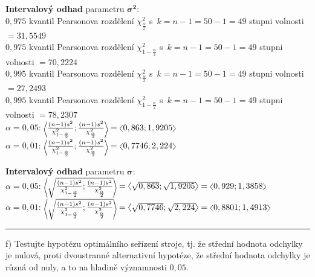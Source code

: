 \documentclass[a4paper, 11pt]{article}
\newcommand{\intlr}[1]{\scaleleftright[1ex]{<}{#1}{>}}
\begin{document}
	\vspace{1em}
	\textbf{Intervalový odhad} parametru $ \boldsymbol{\sigma^2} $: \\
	$ 0,975 $ kvantil Pearsonova rozdělení $ \chi_{\frac{\alpha}{2}}^2 $
	s~$ k = n - 1 = 50 - 1 = 49 $ stupni volnosti $ = 31,5549 $ \\
	$ 0,975 $ kvantil Pearsonova rozdělení $ \chi_{1 - \frac{\alpha}{2}}^2 $
	s~$ k = n - 1 = 50 - 1 = 49 $ stupni volnosti $ = 70,2224 $ \\
	$ 0,995 $ kvantil Pearsonova rozdělení $ \chi_{\frac{\alpha}{2}}^2 $
	s~$ k = n - 1 = 50 - 1 = 49 $ stupni volnosti $ = 27,2493 $ \\
	$ 0,995 $ kvantil Pearsonova rozdělení $ \chi_{1 - \frac{\alpha}{2}}^2 $
	s~$ k = n - 1 = 50 - 1 = 49 $ stupni volnosti $ = 78,2307 $ \\
	$ \alpha = 0,05 $: $ \intlr{\frac{(n - 1) s^2}{\chi_{1 -
	\frac{\alpha}{2}}^2}; \frac{(n - 1) s^2}{\chi_{\frac{\alpha}{2}}^2}} =
	\intlr{0,863; 1,9205} $ \\
	$ \alpha = 0,01 $: $ \intlr{\frac{(n - 1) s^2}{\chi_{1 -
	\frac{\alpha}{2}}^2}; \frac{(n - 1) s^2}{\chi_{\frac{\alpha}{2}}^2}} =
	\intlr{0,7746; 2,224} $

	\vspace{1em}
	\textbf{Intervalový odhad} parametru $ \boldsymbol{\sigma} $: \\
	$ \alpha = 0,05 $: $ \intlr{\sqrt{\frac{(n - 1) s^2}{\chi_{1 -
	\frac{\alpha}{2}}^2}; \frac{(n - 1) s^2}{\chi_{\frac{\alpha}{2}}^2}}} =
	\intlr{\sqrt{0,863}; \sqrt{1,9205}} = \intlr{0,929; 1,3858} $ \\
	$ \alpha = 0,01 $: $ \intlr{\sqrt{\frac{(n - 1) s^2}{\chi_{1 -
	\frac{\alpha}{2}}^2}; \frac{(n - 1) s^2}{\chi_{\frac{\alpha}{2}}^2}}} =
	\intlr{\sqrt{0,7746}; \sqrt{2,224}} = \intlr{0,8801; 1,4913} $

	\vspace{1em}\noindent\rule{\textwidth}{.5pt}\vspace{1em}

	f) Testujte hypotézu optimálního seřízení stroje, tj. že střední
	hodnota odchylky je nulová, proti dvoustranné alternativní hypotéze,
	že střední hodnota odchylky je různá od nuly, a to na hladině
	významnosti $ 0,05 $.
	\vspace{1em}
\end{document}

